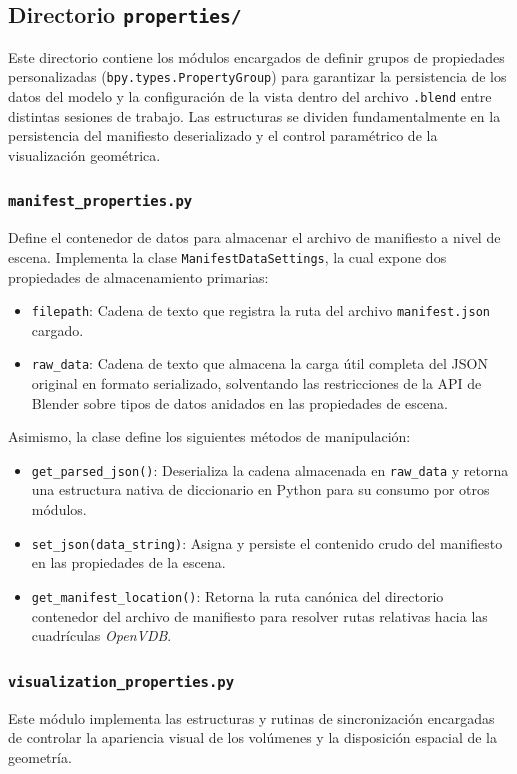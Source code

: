 \subsection{Directorio \texttt{properties/}}
Este directorio contiene los módulos encargados de definir grupos de propiedades personalizadas (\texttt{bpy.types.PropertyGroup}) para garantizar la persistencia 
de los datos del modelo y la configuración de la vista dentro del archivo \texttt{.blend} entre distintas sesiones de trabajo. Las estructuras se dividen 
fundamentalmente en la persistencia del manifiesto deserializado y el control paramétrico de la visualización geométrica.

\subsubsection{\texttt{manifest\_properties.py}}
Define el contenedor de datos para almacenar el archivo de manifiesto a nivel de escena. Implementa la clase \texttt{ManifestDataSettings}, 
la cual expone dos propiedades de almacenamiento primarias:

\begin{itemize}
    \item \texttt{filepath}: Cadena de texto que registra la ruta del archivo \texttt{manifest.json} cargado.
    \item \texttt{raw\_data}: Cadena de texto que almacena la carga útil completa del JSON original en formato serializado, 
    solventando las restricciones de la API de Blender sobre tipos de datos anidados en las propiedades de escena.
\end{itemize}

Asimismo, la clase define los siguientes métodos de manipulación:
\begin{itemize}
    \item \texttt{get\_parsed\_json()}: Deserializa la cadena almacenada en \texttt{raw\_data} y retorna una estructura nativa de 
    diccionario en Python para su consumo por otros módulos.
    \item \texttt{set\_json(data\_string)}: Asigna y persiste el contenido crudo del manifiesto en las propiedades de la escena.
    \item \texttt{get\_manifest\_location()}: Retorna la ruta canónica del directorio contenedor del archivo de manifiesto para 
    resolver rutas relativas hacia las cuadrículas \textit{OpenVDB}.
\end{itemize}

\subsubsection{\texttt{visualization\_properties.py}}
Este módulo implementa las estructuras y rutinas de sincronización encargadas de controlar la apariencia visual de los volúmenes y 
la disposición espacial de la geometría.

